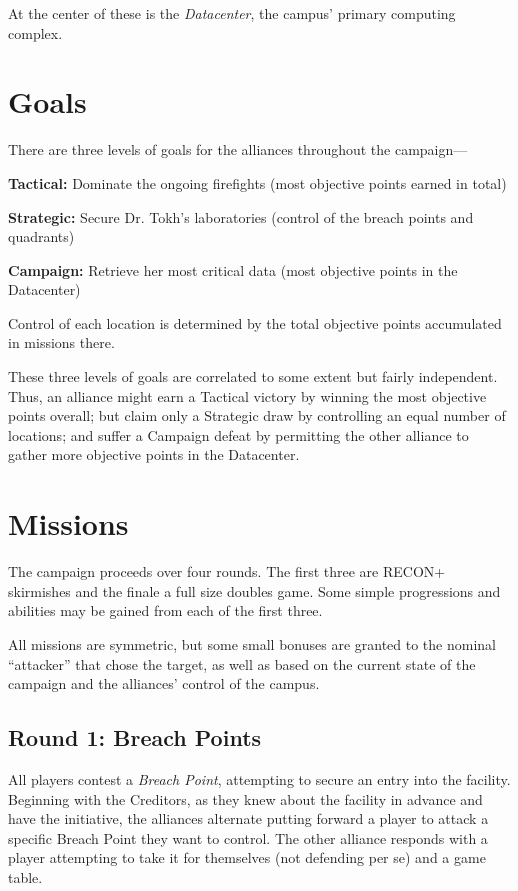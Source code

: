 \medskip
At the center of these is the \textit{Datacenter}, the campus' primary
computing complex.

\clearpage
\section{Goals}

There are three levels of goals for the alliances throughout the campaign---

\begin{squishitemize}  
\item \textbf{Tactical:} Dominate the ongoing firefights \hfill
  (most objective points earned in total)
\item \textbf{Strategic:} Secure Dr. Tokh's laboratories \hfill (control of
  the breach points and quadrants)
\item \textbf{Campaign:} Retrieve her most critical
  data \hfill (most objective points in the Datacenter)
\end{squishitemize}

Control of each location is determined by the total objective points
accumulated in missions there.

These three levels of goals are correlated to some extent but fairly
independent.  Thus, an alliance might earn a Tactical victory by
winning the most objective points overall; but claim only a Strategic
draw by controlling an equal number of locations; and suffer a
Campaign defeat by permitting the other alliance to gather more
objective points in the Datacenter.

\section{Missions}

The campaign proceeds over four rounds.  The first three are RECON+
skirmishes and the finale a full size doubles game.  Some simple
progressions and abilities may be gained from each of the first three.

All missions are symmetric, but some small bonuses are granted to the
nominal ``attacker'' that chose the target, as well as based on the
current state of the campaign and the alliances' control of the
campus.

\subsection{Round 1: Breach Points}

All players contest a \textit{Breach Point}, attempting to secure an
entry into the facility.  Beginning with the Creditors, as they knew
about the facility in advance and have the initiative, the alliances
alternate putting forward a player to attack a specific Breach Point
they want to control.  The other alliance responds with a player
attempting to take it for themselves (not defending per se) and a game
table.

